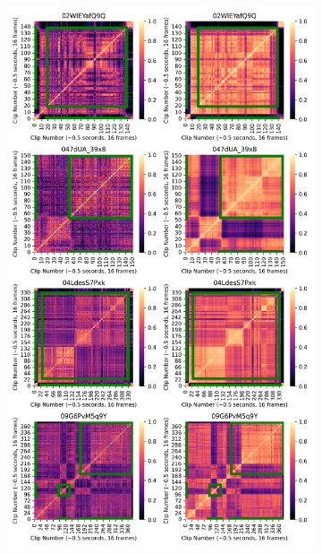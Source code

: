 \begin{figure}[h]
    \begin{subfigure}[b]{0.45\textwidth}
        \includegraphics[width=\linewidth]{assets/img/tsp/tsp-viz-1.png}
    \end{subfigure}%
    \begin{subfigure}[b]{0.45\textwidth}

\end{subfigure}
\end{figure}
